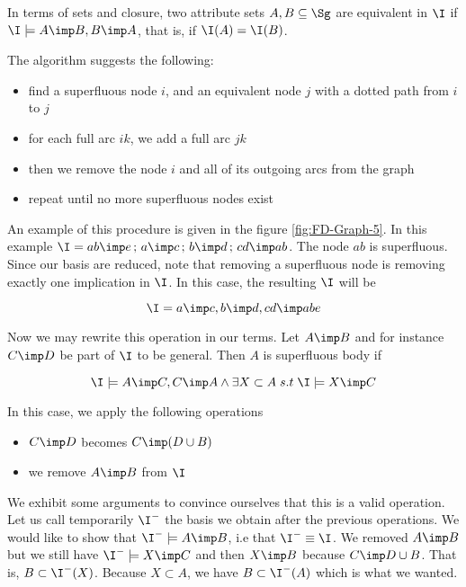 \vspace{1.2em}

In terms of sets and closure, two attribute sets $A, B \subseteq \Sg$ are 
equivalent in $\I$ if $\I \models A \imp B, B \imp A$, that is, if $\I(A) = 
\I(B)$. 



\noindent The algorithm suggests the following:
\begin{itemize}
	\item find a superfluous node $i$, and an equivalent node $j$ with a dotted
	path from $i$ to $j$
	\item for each full arc $ik$, we add a full arc $jk$
	\item then we remove the node $i$ and all of its outgoing arcs from the 
	graph
	\item repeat until no more superfluous nodes exist
\end{itemize}
\noindent An example of this procedure is given in the figure
\ref{fig:FD-Graph-5}. In this example $\I = {ab \imp e \, ; \, a \imp c
	\, ; \, b \imp d \, ; \, cd \imp ab}$. The node $ab$ is superfluous. Since 
	our
basis are reduced, note that removing a superfluous node is removing exactly 
one implication in $\I$. In this case, the resulting $\I$ will be

\[ \I = {a \imp c, b \imp d, cd \imp abe} \] 

\noindent Now we may rewrite this operation in our terms. Let $A \imp B$ and 
for instance $C \imp D$ be part of $\I$ to be general. Then $A$ is superfluous
body if

\[ \I \models A \imp C, C \imp A \land \exists X \subset A \; s.t \;
\I \models X \imp C \]

\noindent In this case, we apply the following operations
\begin{itemize}
	\item $C \imp D$ becomes $C \imp (D \cup B)$
	\item we remove $A \imp B$ from $\I$
\end{itemize}

\noindent We exhibit some arguments to convince ourselves that this is a valid
operation. Let us call temporarily $\I^{-}$ the basis we obtain after the 
previous operations. We would like to show that $\I^{-} \models A \imp B$, i.e
that $\I^{-} \equiv \I$. We removed $A \imp B$ but we still have $\I^{-} \models
X \imp C$ and then $X \imp B$ because $C \imp D \cup B$. That is, $B \subset 
\I^{-}(X)$. Because $X \subset A$, we have $B \subset \I^{-}(A)$ which is what
we wanted. 


